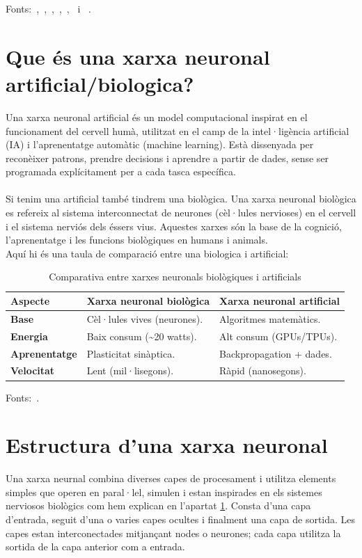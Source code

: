 Fonts:~\cite{Universitat_oberta_catalunya},~\cite{Generalitat},~\cite{IBM_machine_learning},~\cite{Ultralytics},~\cite{bengio2012},~\cite{Ai_Act} i ~\cite{Unesco}.

\section{Que és una xarxa neuronal artificial/biologica?}\label{sec:xarxa neuronal}
Una xarxa neuronal artificial és un model computacional inspirat en el funcionament del cervell humà, utilitzat en el camp de la intel·ligència artificial (IA) i l'aprenentatge automàtic (machine learning). Està dissenyada per reconèixer patrons, prendre decisions i aprendre a partir de dades, sense ser programada explícitament per a cada tasca específica.\\ \\
Si tenim una artificial també tindrem una biològica. Una xarxa neuronal biològica es refereix al sistema interconnectat de neurones (cèl·lules nervioses) en el cervell i el sistema nerviós dels éssers vius. Aquestes xarxes són la base de la cognició, l'aprenentatge i les funcions biològiques en humans i animals.\\
Aquí hi és una taula de comparació entre una biologica i artificial:

\begin{table}[h!]
\begin{tabular}{|l|l|l|}
\hline
\textbf{Aspecte} & \textbf{Xarxa neuronal biològica} & \textbf{Xarxa neuronal artificial} \\ \hline
\textbf{Base} & Cèl·lules vives (neurones). & Algoritmes matemàtics. \\ \hline
\textbf{Energia} & Baix consum (\textasciitilde20 watts). & Alt consum (GPUs/TPUs). \\ \hline
\textbf{Aprenentatge} & Plasticitat sinàptica. & Backpropagation + dades. \\ \hline
\textbf{Velocitat} & Lent (mil·lisegons). & Ràpid (nanosegons). \\ \hline
\end{tabular}
\caption{Comparativa entre xarxes neuronals biològiques i artificials}
\end{table}
Fonts:~\cite{IBM_Xarxa}.

\section{Estructura d'una xarxa neuronal}\label{sec:3.6}
Una xarxa neurnal combina diverses capes de procesament i utilitza elements simples que operen en paral·lel, simulen i estan inspirades en els sistemes nerviosos biològics com hem explican en l'apartat \ref{sec:xarxa neuronal}. Consta d'una capa d'entrada, seguit d'una o varies capes ocultes i finalment una capa de sortida. Les capes estan interconectades mitjançant nodes o neurones; cada capa utilitza la sortida de la capa anterior com a entrada.

